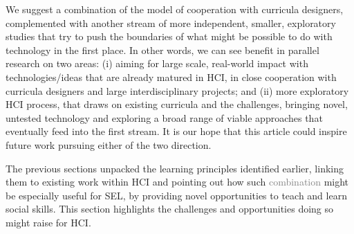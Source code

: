 \documentclass[prodmode,acmtochi]{acmsmall}
\newcommand{\todo}[1]{\textrm{\textrm{\textcolor{LightBlue}{[[#1]]}}}}
\newcommand{\rephrase}[1]{\textrm{\textrm{\textcolor{gray}{#1}}}}
\begin{document}
We suggest a combination of the  model of cooperation with curricula designers, complemented %
with another stream of more independent, smaller, exploratory studies that try to push the boundaries of what might be possible to do with technology in the first place.  In other words, we can see benefit in parallel research on two areas: (i) aiming for large scale, real-world impact with technologies/ideas that are already matured in HCI, in close cooperation with curricula designers and large interdisciplinary projects; and (ii) more exploratory HCI process, that draws on existing curricula and the challenges, bringing novel, untested technology and exploring a broad range of viable approaches that eventually feed into the first stream. It is our hope that this article could inspire future work pursuing either of the two direction. 




\iffalse
The previous sections unpacked the learning  principles identified earlier, linking them to existing work within HCI and pointing out how such \rephrase{combination} might be especially useful for SEL, by providing novel opportunities to teach and learn social skills.  
This section highlights the challenges and opportunities doing so might raise for HCI. 

\end{document}

